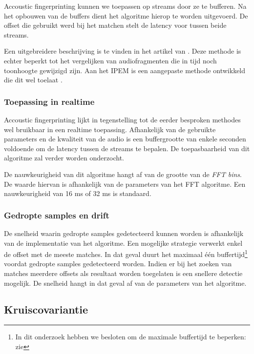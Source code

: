 Accoustic fingerprinting kunnen we toepassen op streams door ze te bufferen. Na het opbouwen van de buffers dient het algoritme hierop te worden uitgevoerd. De offset die gebruikt werd bij het matchen stelt de latency voor tussen beide streams.

Een uitgebreidere beschrijving is te vinden in het artikel van . Deze methode is echter beperkt tot het vergelijken van audiofragmenten die in tijd noch toonhoogte gewijzigd zijn. Aan het IPEM is een aangepaste methode ontwikkeld die dit wel toelaat \cite{six2014panako}.

\subsubsection{Toepassing in realtime}

Accoustic fingerprinting lijkt in tegenstelling tot de eerder besproken methodes wel bruikbaar in een realtime toepassing. Afhankelijk van de gebruikte parameters en de kwaliteit van de audio is een buffergrootte van enkele seconden voldoende om de latency tussen de streams te bepalen. De toepasbaarheid van dit algoritme zal verder worden onderzocht.

De nauwkeurigheid van dit algoritme hangt af van de grootte van de \textit{FFT bins}. De waarde hiervan is afhankelijk van de parameters van het FFT algoritme. Een nauwkeurigheid van 16 ms of 32 ms is standaard.

\subsubsection{Gedropte samples en drift}

De snelheid waarin gedropte samples gedetecteerd kunnen worden is afhankelijk van de implementatie van het algoritme. Een mogelijke strategie verwerkt enkel de offset met de meeste matches. In dat geval duurt het maximaal één buffertijd\footnote{In dit onderzoek hebben we besloten om de maximale buffertijd te beperken: zie } voordat gedropte samples gedetecteerd worden. Indien er bij het zoeken van matches meerdere offsets als resultaat worden toegelaten is een snellere detectie mogelijk. De snelheid hangt in dat geval af van de parameters van het algoritme.

\subsection{Kruiscovariantie}

